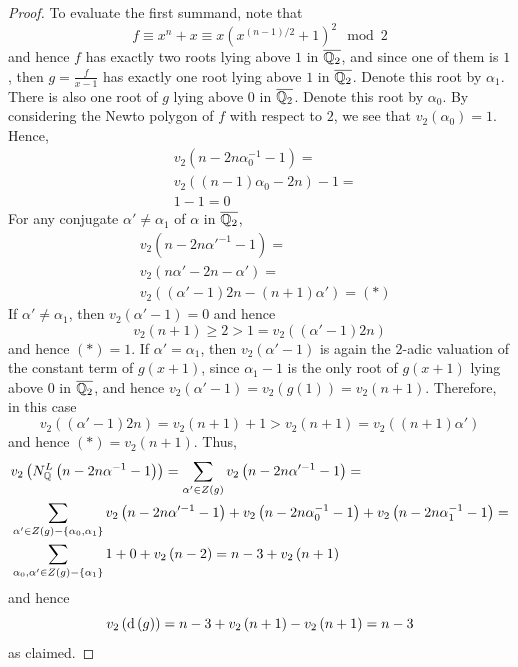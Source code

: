 \documentclass[../main.tex]{subfiles}
\begin{document}
\begin{proof}
  To evaluate the first summand, note that
  \[
    f \equiv x^n + x \equiv x \left( x^{\left( n - 1 \right)/2} + 1 \right)^2 \mod 2 
  \]
  and hence $f$ has exactly two roots lying above $1$ in $\overline{\mathbb{Q}_2}$, and since one of them is $1$, then $g = \frac{f}{x-1}$ has exactly one root lying above $1$ in $\overline{\mathbb{Q}_2}$.
  Denote this root by $\alpha_1$.
  There is also one root of $g$ lying above $0$ in $\overline{\mathbb{Q}_2}$.
  Denote this root by $\alpha_0$.
  By considering the Newto polygon of $f$ with respect to $2$, we see that $v_2\left( \alpha_0 \right) = 1$.
  Hence,
  \begin{align*}
    & v_2\left( n - 2n\alpha_0^{-1} - 1 \right) = \\
    & v_2\left( \left( n - 1 \right)\alpha_0 - 2n \right) - 1 = \\
    & 1 - 1 = 0
  \end{align*}
  For any conjugate $\alpha' \neq \alpha_1$ of $\alpha$ in $\overline{\mathbb{Q}_2}$,
  \begin{align*}
    & v_2\left( n - 2n\alpha'^{-1} - 1 \right) = \\
    & v_2\left( n\alpha' - 2n - \alpha' \right) = \\
    & v_2\left( \left( \alpha' - 1 \right)2n - \left( n + 1 \right)\alpha' \right) = \left( \ast \right)
  \end{align*}
  If $\alpha' \neq \alpha_1$, then $v_2\left( \alpha' - 1 \right) = 0$ and hence 
  \[
    v_2\left( n + 1 \right) \geq 2 > 1 = v_2\left( \left( \alpha' - 1 \right)2n \right)
  \]
  and hence $\left( \ast \right) = 1$.
  If $\alpha' = \alpha_1$, then $v_2\left( \alpha' - 1 \right)$ is again the $2$-adic valuation of the constant term of $g\left( x + 1 \right)$, since $\alpha_1 - 1$ is the only root of $g\left( x + 1 \right)$ lying above $0$ in $\overline{\mathbb{Q}_2}$, and hence $v_2\left( \alpha' - 1 \right) = v_2\left( g\left( 1 \right) \right) = v_2\left( n + 1 \right)$.
  Therefore, in this case 
  \[
    v_2\left( \left( \alpha' - 1 \right)2n \right) = v_2\left( n + 1 \right) + 1 > v_2\left( n + 1 \right) = v_2\left( \left( n + 1 \right)\alpha' \right)
  \]
   and hence $\left( \ast \right) = v_2\left( n + 1 \right)$.
   Thus,
  \begin{align*}
    & v_2\left( N^L_{\mathbb{Q}}\left( n - 2n\alpha^{-1} - 1 \right) \right) =
    \sum_{\alpha' \in Z\left( g \right)} v_2\left( n - 2n\alpha'^{-1} - 1 \right) = \\
    & \sum_{\alpha' \in Z\left( g \right) - \left\{ \alpha_0, \alpha_1 \right\}} v_2\left( n - 2n\alpha'^{-1} - 1 \right) + v_2\left( n - 2n\alpha_0^{-1} - 1 \right) + v_2\left( n - 2n\alpha_1^{-1} - 1 \right) = \\
    & \sum_{\alpha_0, \alpha' \in Z\left( g \right) - \left\{ \alpha_1 \right\}} 1 + 0 + v_2\left( n - 2 \right) = n - 3 + v_2\left( n + 1 \right)
  \end{align*}
  and hence \[
    v_2\left( \operatorname{\rm d}\left( g \right) \right) = n - 3 + v_2\left( n + 1 \right) - v_2\left( n + 1 \right) = n - 3
  \]
  as claimed.
\end{proof}
\end{document}
